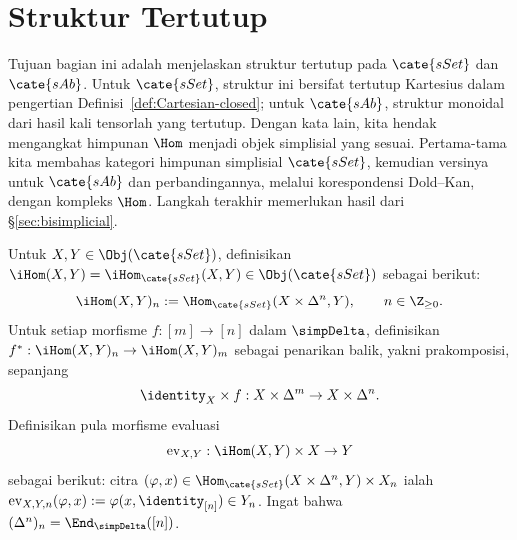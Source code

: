 
\section{Struktur Tertutup}\label{sec:closed-simplicial}
\hypertarget{o014.aljabr2.chapter8.closed-structure}{ }
Tujuan bagian ini adalah menjelaskan struktur tertutup pada $\cate{sSet}$
dan $\cate{sAb}$. Untuk $\cate{sSet}$, struktur ini bersifat tertutup
Kartesius dalam pengertian Definisi~\ref{def:Cartesian-closed}; untuk
$\cate{sAb}$, struktur monoidal dari hasil kali tensorlah yang tertutup.
Dengan kata lain, kita hendak mengangkat himpunan $\Hom$ menjadi objek
simplisial yang sesuai. Pertama-tama kita membahas kategori himpunan
simplisial $\cate{sSet}$, kemudian versinya untuk $\cate{sAb}$ dan
perbandingannya, melalui korespondensi Dold--Kan, dengan kompleks $\Hom$.
Langkah terakhir memerlukan hasil dari \S\ref{sec:bisimplicial}.

\begin{definition}\label{def:internal-Hom-sSet}
	Untuk $X,Y\in\Obj(\cate{sSet})$, definisikan
	$\iHom(X,Y)=\iHom_{\cate{sSet}}(X,Y)\in\Obj(\cate{sSet})$ sebagai berikut:
	\[
	\iHom(X,Y)_n:=\Hom_{\cate{sSet}}(X\times\Delta^n,Y),
	\qquad n\in\Z_{\geq0}.
	\]
	Untuk setiap morfisme $f:[m]\to[n]$ dalam $\simpDelta$, definisikan
	$f^*:\iHom(X,Y)_n\to\iHom(X,Y)_m$ sebagai penarikan balik, yakni
	prakomposisi, sepanjang
	\[
	\identity_X\times f:X\times\Delta^m\to X\times\Delta^n.
	\]
	Definisikan pula morfisme evaluasi
	\[
	\mathrm{ev}_{X,Y}:\iHom(X,Y)\times X\to Y
	\]
	sebagai berikut: citra
	$(\varphi,x)\in\Hom_{\cate{sSet}}(X\times\Delta^n,Y)\times X_n$ ialah
	$\mathrm{ev}_{X,Y,n}(\varphi,x):=\varphi(x,\identity_{[n]})\in Y_n$.
	Ingat bahwa $(\Delta^n)_n=\End_{\simpDelta}([n])$.
\end{definition}

